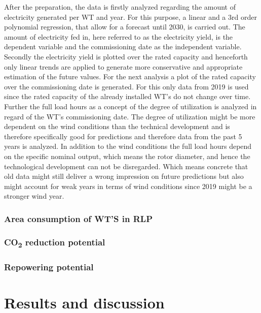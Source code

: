 \documentclass[a4paper,11pt]{article}
\begin{document}
After the preparation, the data is firstly analyzed regarding the amount of electricity generated per WT and year. For this purpose, a linear and a 3rd order polynomial regression, that allow for a forecast until 2030, is carried out. The amount of electricity fed in, here referred to as the electricity yield, is the dependent variable and the commissioning date as the independent variable. Secondly the electricity yield is plotted over the rated capacity and henceforth only linear trends are applied to generate more conservative and appropriate estimation of the future values. For the next analysis a plot of the rated capacity over the commissioning date is generated. For this only data from 2019 is used since the rated capacity of the already installed WT's do not change over time. Further the full load hours as a concept of the degree of utilization is analyzed in regard of the WT's commissioning date. The degree of utilization might be more dependent on the wind conditions than the technical development and is therefore specifically good for predictions and therefore data from the past 5 years is analyzed. In addition to the wind conditions the full load hours depend on the specific nominal output, which means the rotor diameter, and hence the technological development can not be disregarded. Which means concrete that old data might still deliver a wrong impression on future predictions but also might account for weak years in terms of wind conditions since 2019 might be a stronger wind year.

\hypertarget{area-consumption-of-wts-in-rlp}{%
\subsubsection{Area consumption of WT'S in RLP}\label{area-consumption-of-wts-in-rlp}}

\hypertarget{co-reduction-potential}{%
\subsubsection{\texorpdfstring{CO\textsubscript{2} reduction potential}{CO reduction potential}}\label{co-reduction-potential}}

\hypertarget{repowering-potential}{%
\subsubsection{Repowering potential}\label{repowering-potential}}

\hypertarget{results-and-discussion}{%
\section{Results and discussion}\label{results-and-discussion}}
\end{document}
